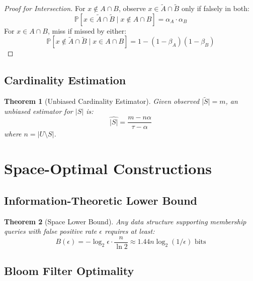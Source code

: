 \documentclass[11pt,final,hidelinks]{article}
\newtheorem{theorem}{Theorem}[section]
\newcommand{\obs}[1]{\widetilde{#1}}
\newcommand{\fprate}{\alpha}
\newcommand{\fnrate}{\beta}
\newcommand{\tprate}{\tau}
\newcommand{\ProbCond}[2]{\mathbb{P}\left[#1 \mid #2\right]}
\newcommand{\Card}[1]{\lvert#1\rvert}
\begin{document}
\begin{proof}[Proof for Intersection]
For $x \notin A \cap B$, observe $x \in \obs{A} \cap \obs{B}$ only if falsely in both:
\begin{equation}
\ProbCond{x \in \obs{A} \cap \obs{B}}{x \notin A \cap B} = \fprate_A \cdot \fprate_B
\end{equation}
For $x \in A \cap B$, miss if missed by either:
\begin{equation}
\ProbCond{x \notin \obs{A} \cap \obs{B}}{x \in A \cap B} = 1-(1-\fnrate_A)(1-\fnrate_B)
\end{equation}
\end{proof}

\subsection{Cardinality Estimation}

\begin{theorem}[Unbiased Cardinality Estimator]
Given observed $\Card{\obs{S}} = m$, an unbiased estimator for $\Card{S}$ is:
\begin{equation}
\widehat{\Card{S}} = \frac{m - n\fprate}{\tprate - \fprate}
\end{equation}
where $n = \Card{U \setminus S}$.
\end{theorem}

\section{Space-Optimal Constructions}

\subsection{Information-Theoretic Lower Bound}

\begin{theorem}[Space Lower Bound]
Any data structure supporting membership queries with false positive rate $\epsilon$ requires at least:
\begin{equation}
B(\epsilon) = -\log_2 \epsilon \cdot \frac{n}{\ln 2} \approx 1.44n\log_2(1/\epsilon) \text{ bits}
\end{equation}
\end{theorem}

\subsection{Bloom Filter Optimality}
\end{document}
